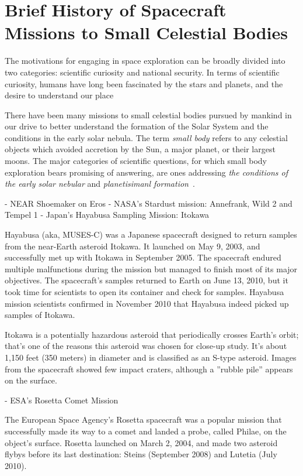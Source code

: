 \section{Brief History of Spacecraft Missions to Small Celestial Bodies}

The motivations for engaging in space exploration can be broadly divided into two categories: scientific curiosity and national security. In terms of scientific curiosity, humans have long been fascinated by the stars and planets, and the desire to understand our place

There have been many missions to small celestial bodies pursued by mankind in
our drive to better understand the formation of the Solar System and the
conditions in the early solar nebula. The term \textit{small body} refers to any
celestial objects which avoided accretion by the Sun, a major planet, or their
largest moons. The major categories of scientific questions, for which
small body exploration bears promising of answering, are ones addressing
\textit{the conditions of the early solar nebular} and \textit{planetisimanl
    formation}~\cite{Davidsson2021}.

- NEAR Shoemaker on Eros
- NASA's Stardust mission: Annefrank, Wild 2 and Tempel 1
- Japan's Hayabusa Sampling Mission: Itokawa

Hayabusa (aka, MUSES-C) was a Japanese spacecraft designed to return samples
from the near-Earth asteroid Itokawa. It launched on May 9, 2003, and
successfully met up with Itokawa in September 2005. The spacecraft endured
multiple malfunctions during the mission but managed to finish most of its major
objectives. The spacecraft's samples returned to Earth on June 13, 2010, but it
took time for scientists to open its container and check for samples. Hayabusa
mission scientists confirmed in November 2010 that Hayabusa indeed picked up
samples of Itokawa.

Itokawa is a potentially hazardous asteroid that periodically crosses Earth's
orbit; that's one of the reasons this asteroid was chosen for close-up study.
It's about 1,150 feet (350 meters) in diameter and is classified as an S-type
asteroid. Images from the spacecraft showed few impact craters, although a
''rubble pile'' appears on the surface.


- ESA's Rosetta Comet Mission

The European Space Agency's Rosetta spacecraft was a popular mission that
successfully made its way to a comet and landed a probe, called Philae, on the
object's surface. Rosetta launched on March 2, 2004, and made two asteroid
flybys before its last destination: Steins (September 2008) and Lutetia (July
2010).

